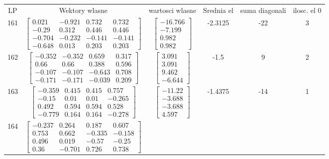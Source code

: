 \documentclass[a4paper,12pt]{article}
\begin{document}
\bgroup {} \vspace{0.2in} \begin{tabular}{c c c c c c}
LP &Wektory wlasne & wartosci wlasne & Srednia el & suma diagonali & ilosc. el 0\\
161
&
$\begin{bmatrix} 0.021 & -0.921 & 0.732 & 0.732 \\ -0.29 & 0.312 & 0.446 & 0.446 \\ -0.704 & -0.232 & -0.141 & -0.141 \\ -0.648 & 0.013 & 0.203 & 0.203 \end{bmatrix}$
&
$\begin{bmatrix} -16.766 \\ -7.199 \\ 0.982 \\ 0.982 \end{bmatrix}$
&
-2.3125
&
-22
&
3
\\
162
&
$\begin{bmatrix} -0.352 & -0.352 & 0.659 & 0.317 \\ 0.66 & 0.66 & 0.388 & 0.596 \\ -0.107 & -0.107 & -0.643 & 0.708 \\ -0.171 & -0.171 & -0.039 & 0.209 \end{bmatrix}$
&
$\begin{bmatrix} 3.091 \\ 3.091 \\ 9.462 \\ -6.644 \end{bmatrix}$
&
-1.5
&
9
&
2
\\
163
&
$\begin{bmatrix} -0.359 & 0.415 & 0.415 & 0.757 \\ -0.15 & 0.01 & 0.01 & -0.265 \\ 0.492 & 0.594 & 0.594 & 0.528 \\ -0.779 & 0.164 & 0.164 & -0.278 \end{bmatrix}$
&
$\begin{bmatrix} -11.22 \\ -3.688 \\ -3.688 \\ 4.597 \end{bmatrix}$
&
-1.4375
&
-14
&
1
\\
164
&
$\begin{bmatrix} -0.237 & 0.264 & 0.187 & 0.607 \\ 0.753 & 0.662 & -0.335 & -0.158 \\ 0.496 & 0.019 & -0.57 & -0.25 \\ 0.36 & -0.701 & 0.726 & 0.738 \end{bmatrix}$

\end{tabular}
\end{document}
